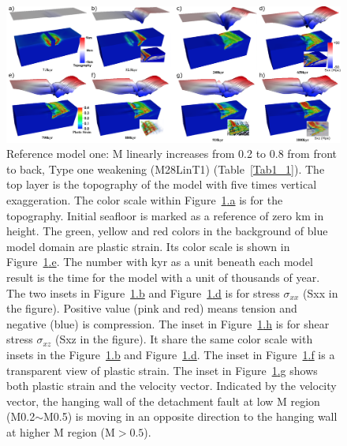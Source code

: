 \begin{figure}[h]
  \centering
    \includegraphics[width=1.0\textwidth]{./Figures/fig_Results1_1.png}
  \caption{Reference model one: M linearly increases from 0.2 to 0.8 from front to back, Type one weakening (M28LinT1) (Table~\hyperref[Tab1_1]{\ref{Tab1_1}}). The top layer is the topography of the model with five times vertical exaggeration. The color scale within Figure~\hyperref[fig_Results1_1]{\ref{fig_Results1_1}.a} is for the topography. Initial seafloor is marked as a reference of zero km in height.  The green, yellow and red colors in the background of blue model domain are plastic strain. Its color scale is shown in Figure~\hyperref[fig_Results1_1]{\ref{fig_Results1_1}.e}. The number with kyr as a unit beneath each model result is the time for the model with a unit of thousands of year. The two insets in Figure~\hyperref[fig_Results1_1]{\ref{fig_Results1_1}.b} and Figure~\hyperref[fig_Results1_1]{\ref{fig_Results1_1}.d} is for stress $\sigma_{xx}$ (Sxx in the figure). Positive value (pink and red) means tension and negative (blue) is compression. The inset in Figure~\hyperref[fig_Results1_1]{\ref{fig_Results1_1}.h} is for shear stress $\sigma_{xz}$ (Sxz in the figure). It share the same color scale with insets in the Figure~\hyperref[fig_Results1_1]{\ref{fig_Results1_1}.b} and Figure~\hyperref[fig_Results1_1]{\ref{fig_Results1_1}.d}. The inset in Figure~\hyperref[fig_Results1_1]{\ref{fig_Results1_1}.f} is a transparent view of plastic strain. The inset in Figure~\hyperref[fig_Results1_1]{\ref{fig_Results1_1}.g} shows both plastic strain and the velocity vector. Indicated by the velocity vector, the hanging wall of the detachment fault at low M region (M0.2$\sim$M0.5) is moving in an opposite direction to the hanging wall at higher M region (M$>0.5$).} %
 \label{fig_Results1_1}
\end{figure}   

